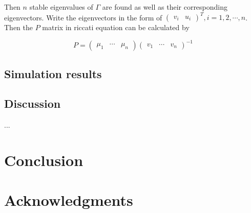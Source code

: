 \documentclass[hyperref]{article}
\theoremstyle{nonumberplain}
\begin{document}
	Then $n$ stable eigenvalues of $\Gamma$ are found as well as their corresponding eigenvectors. Write the eigenvectors in the form of $\begin{pmatrix}
	v_{i} & u_{i}
	\end{pmatrix}^{T},i=1,2,\cdots ,n$. Then the $P$ matrix in riccati equation can be calculated by
	
	\begin{equation}
	P=\begin{pmatrix}
	\mu _{1} &\cdots   & \mu _{n}
	\end{pmatrix}
	\begin{pmatrix}
	v_{1} &\cdots   & v_{n}
	\end{pmatrix}^{-1}
	\label{eq22}
	\end{equation}
	
	
	\subsection{Simulation results}
	
	\subsection{Discussion}
	...
	\section{Conclusion}
	\section*{Acknowledgments}
	
	
	
	{}
	
\end{document}
